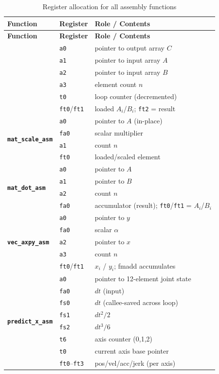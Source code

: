 \documentclass[12pt,a4paper]{article}
\newcommand{\reg}[1]{\texttt{\color{reg}#1}}
\newcommand{\func}[1]{\texttt{\bfseries #1}}
\begin{document}
\begin{longtable}{p{3.8cm}p{2.2cm}p{8.2cm}}
\caption{Register allocation for all assembly functions}
\label{tab:regalloc}\\
\toprule
\textbf{Function} & \textbf{Register} & \textbf{Role / Contents} \\
\midrule
\endfirsthead
\toprule
\textbf{Function} & \textbf{Register} & \textbf{Role / Contents} \\
\midrule
\endhead
\bottomrule
\endfoot

\multirow{6}{*}{\func{mat\_add\_asm}}
  & \reg{a0}   & pointer to output array $C$ \\
  & \reg{a1}   & pointer to input array $A$ \\
  & \reg{a2}   & pointer to input array $B$ \\
  & \reg{a3}   & element count $n$ \\
  & \reg{t0}   & loop counter (decremented) \\
  & \reg{ft0}/\reg{ft1} & loaded $A_i$/$B_i$; \reg{ft2} = result \\
\midrule

\multirow{4}{*}{\func{mat\_scale\_asm}}
  & \reg{a0}   & pointer to $A$ (in-place) \\
  & \reg{fa0}  & scalar multiplier \\
  & \reg{a1}   & count $n$ \\
  & \reg{ft0}  & loaded/scaled element \\
\midrule

\multirow{4}{*}{\func{mat\_dot\_asm}}
  & \reg{a0}   & pointer to $A$ \\
  & \reg{a1}   & pointer to $B$ \\
  & \reg{a2}   & count $n$ \\
  & \reg{fa0}  & accumulator (result); \reg{ft0}/\reg{ft1} = $A_i$/$B_i$ \\
\midrule

\multirow{5}{*}{\func{vec\_axpy\_asm}}
  & \reg{a0}   & pointer to $y$ \\
  & \reg{fa0}  & scalar $\alpha$ \\
  & \reg{a2}   & pointer to $x$ \\
  & \reg{a3}   & count $n$ \\
  & \reg{ft0}/\reg{ft1} & $x_i$ / $y_i$; fmadd accumulates \\
\midrule

\multirow{8}{*}{\func{predict\_x\_asm}}
  & \reg{a0}   & pointer to 12-element joint state \\
  & \reg{fa0}  & $dt$ (input) \\
  & \reg{fs0}  & $dt$ (callee-saved across loop) \\
  & \reg{fs1}  & $dt^2/2$ \\
  & \reg{fs2}  & $dt^3/6$ \\
  & \reg{t6}   & axis counter (0,1,2) \\
  & \reg{t0}   & current axis base pointer \\
  & \reg{ft0}--\reg{ft3} & pos/vel/acc/jerk (per axis) \\
\midrule


\end{longtable}
\end{document}
